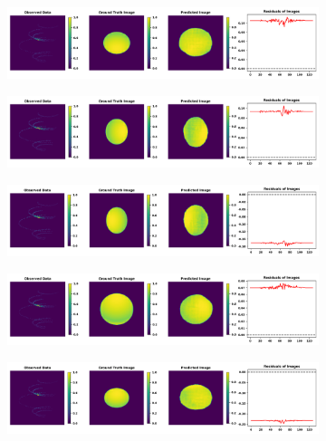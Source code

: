 \documentclass[fleqn,usenatbib,twocolumn]{mnras}
\providecommand{\DIFaddend}{} %
\DeclareRobustCommand{\DIFaddend}{\DIFOaddend \let\includegraphics\DIFOincludegraphics} %
\begin{document}
\DIFaddend \begin{figure}
	\centering
	\begin{subfigure}{\linewidth}
		\includegraphics[width=\linewidth]{../fig/testing_image/image_0.png}
	\end{subfigure}
	\begin{subfigure}{\linewidth}
		\includegraphics[width=\linewidth]{../fig/testing_image/image_16.png}
	\end{subfigure}
	\begin{subfigure}{\linewidth}
		\includegraphics[width=\linewidth]{../fig/testing_image/image_35.png}
	\end{subfigure}
	\begin{subfigure}{\linewidth}
		\includegraphics[width=\linewidth]{../fig/testing_image/image_38.png}
	\end{subfigure}
	\begin{subfigure}{\linewidth}
		\includegraphics[width=\linewidth]{../fig/testing_image/image_42.png}

\end{subfigure}
\end{figure}
\end{document}
